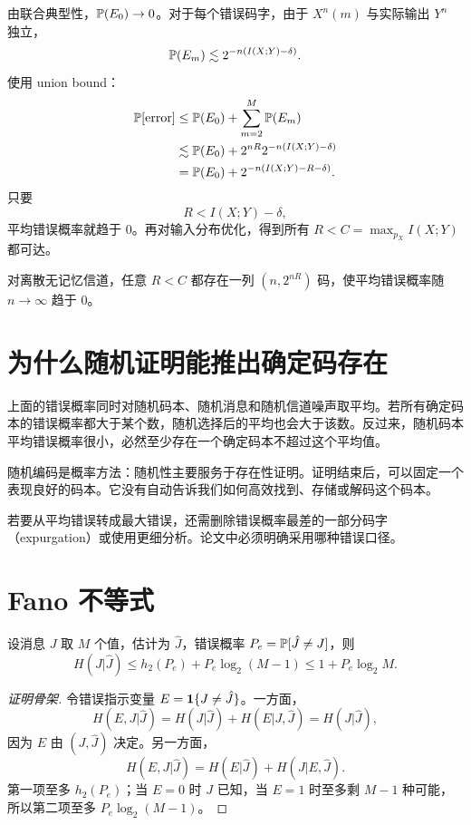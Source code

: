 由联合典型性，$\mathbb{P}(E_0)\to0$。对于每个错误码字，由于 $X^n(m)$ 与实际输出 $Y^n$ 独立，
\[
\mathbb{P}(E_m)\lesssim2^{-n(I(X;Y)-\delta)}.
\]
使用 union bound：
\begin{align*}
\mathbb{P}[\text{error}]
&\le\mathbb{P}(E_0)+\sum_{m=2}^M\mathbb{P}(E_m)\\
&\lesssim\mathbb{P}(E_0)+2^{nR}2^{-n(I(X;Y)-\delta)}\\
&=\mathbb{P}(E_0)+2^{-n(I(X;Y)-R-\delta)}.
\end{align*}
只要
\[
R<I(X;Y)-\delta,
\]
平均错误概率就趋于 0。再对输入分布优化，得到所有 $R<C=\max_{p_X}I(X;Y)$ 都可达。

\begin{theorem}
对离散无记忆信道，任意 $R<C$ 都存在一列 $(n,2^{nR})$ 码，使平均错误概率随 $n\to\infty$ 趋于 0。
\end{theorem}

\section{为什么随机证明能推出确定码存在}

上面的错误概率同时对随机码本、随机消息和随机信道噪声取平均。若所有确定码本的错误概率都大于某个数，随机选择后的平均也会大于该数。反过来，随机码本平均错误概率很小，必然至少存在一个确定码本不超过这个平均值。

\begin{intuitionbox}
随机编码是概率方法：随机性主要服务于存在性证明。证明结束后，可以固定一个表现良好的码本。它没有自动告诉我们如何高效找到、存储或解码这个码本。
\end{intuitionbox}

若要从平均错误转成最大错误，还需删除错误概率最差的一部分码字（expurgation）或使用更细分析。论文中必须明确采用哪种错误口径。

\section{Fano 不等式}

\begin{theorem}
设消息 $J$ 取 $M$ 个值，估计为 $\hat J$，错误概率 $P_e=\mathbb{P}[\hat J\ne J]$，则
\[
H(J|\hat J)\le h_2(P_e)+P_e\log_2(M-1)
\le1+P_e\log_2M.
\]
\end{theorem}

\begin{proof}[证明骨架]
令错误指示变量 $E=\mathbf{1}\{J\ne\hat J\}$。一方面，
\[
H(E,J|\hat J)=H(J|\hat J)+H(E|J,\hat J)=H(J|\hat J),
\]
因为 $E$ 由 $(J,\hat J)$ 决定。另一方面，
\[
H(E,J|\hat J)=H(E|\hat J)+H(J|E,\hat J).
\]
第一项至多 $h_2(P_e)$；当 $E=0$ 时 $J$ 已知，当 $E=1$ 时至多剩 $M-1$ 种可能，所以第二项至多 $P_e\log_2(M-1)$。
\end{proof}

